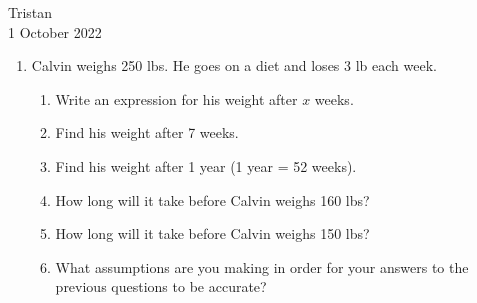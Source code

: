 \documentclass[14pt]{extarticle} %
\begin{document}
\hfill Tristan\\
\null\hfill 1 October 2022

\vspace{10mm}

\begin{enumerate}[label=\Alph*.), itemsep=\fill]
    \item  Calvin weighs 250 lbs. He goes on a diet and loses 3 lb each week.
    \begin{enumerate}[itemsep=\fill]
        \item Write an expression for his weight after $x$ weeks.
        \item Find his weight after 7 weeks.
        \item Find his weight after 1 year (1 year = 52 weeks).
\vfill\clearpage
        \item How long will it take before Calvin weighs 160 lbs?
        \item How long will it take before Calvin weighs 150 lbs?
        \item What assumptions are you making in order for your answers to the previous questions to be accurate?
    \end{enumerate}
\vfill\end{enumerate}
\end{document}
